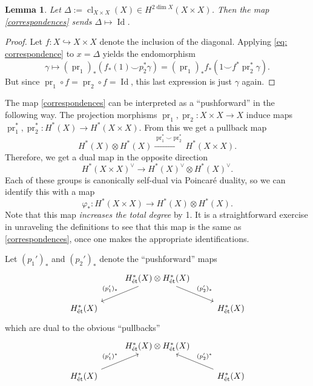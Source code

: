 \documentclass[10pt, reqno]{amsart}
\numberwithin{equation}{subsection}
\newcommand{\co}{\colon}
\DeclareMathOperator{\et}{\acute{e}t}
\DeclareMathOperator{\Id}{Id}
\DeclareMathOperator{\cla}{cl}
\DeclareMathOperator{\pr}{pr}
\newtheorem{lemma}[thm]{Lemma}
\theoremstyle{remark}
\begin{document}
\begin{lemma}\label{diag_is_identity}
Let $\Delta := \cla_{X \times X}(X) \in H^{2 \dim X}_{\et}(X \times X)$. Then the map \eqref{correspondences} sends $\Delta \mapsto \Id$. 
\end{lemma}

\begin{proof}
Let $f \co X\hookrightarrow X\times X$ denote the inclusion of the diagonal. Applying \eqref{eq: correspondence} to $x =\Delta$ yields the endomorphism
\[
\gamma \mapsto (\pr_1)_* (f_*(1) \smile p_2^* \gamma)  = (\pr_1)_* f_* (1 \smile f^* \pr_2^* \gamma) .
\]
But since $\pr_1 \circ f = \pr_2 \circ f = \Id$, this last expression is just $\gamma$ again. 
\end{proof}


The map \eqref{correspondences} can be interpreted as a ``pushforward'' in the following way. The projection morphisms $\pr_1, \pr_2 \co X \times X \rightarrow X$ induce maps $\pr_1^*, \pr_2^* \colon H^*_{\et}(X) \rightarrow H^*_{\et}(X \times X)$. From this we get a pullback map 
\[
H^*_{\et}(X) \otimes H^*_{\et}(X) \xrightarrow{\pr_1^* \smile  \pr_2^*} H^*_{\et}(X \times X).
\]
Therefore, we get a dual map in the opposite direction 
\[
H^*_{\et}(X \times X)^{\vee} \rightarrow H^*_{\et}(X)^{\vee} \otimes H^*_{\et}(X)^{\vee}.
\]
Each of these groups is canonically self-dual via Poincar\'{e} duality, so we can identify this with a map 
\begin{equation}\label{push_end}
\varphi_* \colon H^*_{\et}(X \times X) \rightarrow H^*_{\et}(X) \otimes H^*_{\et}(X).
\end{equation}
Note that this map \emph{increases the total degree} by 1. It is a straightforward exercise in unraveling the definitions to see that this map is the same as \eqref{correspondences}, once one makes the appropriate identifications. 



Let $(p_1')_*$ and $(p_2')_*$ denote the ``pushforward'' maps 
\[
\begin{tikzcd}
&  \ar[dl, "(p_1')_*"']  H^*_{\et}(X) \otimes H^*_{\et}(X) \ar[dr, "(p_2')_*"]  \\
 H^*_{\et}(X)  & &   H^*_{\et}(X)
 \end{tikzcd}
\]
which are dual to the obvious ``pullbacks''
\[
\begin{tikzcd}
&  H^*_{\et}(X) \otimes H^*_{\et}(X)    \\
 H^*_{\et}(X)  \ar[ur, "(p_1')^*"]  & & H^*_{\et}(X) \ar[ul, "(p_2')^*"']  
 \end{tikzcd}
 \]
\end{document}
